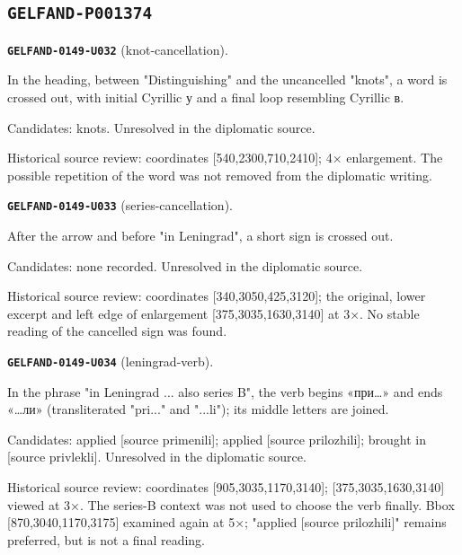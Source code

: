 \documentclass[11pt]{article}
\theoremstyle{definition}
\theoremstyle{remark}
\begin{document}
\subsection*{\texttt{GELFAND-P001374}}
\noindent\leavevmode{}\label{GELFAND-P001374:knot-cancellation:note}\textbf{\texttt{GELFAND-0149-U032}} (knot-cancellation).\par\nopagebreak[4]
In the heading, between "Distinguishing" and the uncancelled "knots", a word is crossed out, with initial Cyrillic у and a final loop resembling Cyrillic в.\par
Candidates: knots. Unresolved in the diplomatic source.\par
Historical source review: coordinates [540,2300,710,2410]; 4× enlargement. The possible repetition of the word was not removed from the diplomatic writing.\par\medskip
\noindent\leavevmode{}\label{GELFAND-P001374:series-cancellation:note}\textbf{\texttt{GELFAND-0149-U033}} (series-cancellation).\par\nopagebreak[4]
After the arrow and before "in Leningrad", a short sign is crossed out.\par
Candidates: none recorded. Unresolved in the diplomatic source.\par
Historical source review: coordinates [340,3050,425,3120]; the original, lower excerpt and left edge of enlargement [375,3035,1630,3140] at 3×. No stable reading of the cancelled sign was found.\par\medskip
\noindent\leavevmode{}\label{GELFAND-P001374:leningrad-verb:note}\textbf{\texttt{GELFAND-0149-U034}} (leningrad-verb).\par\nopagebreak[4]
In the phrase "in Leningrad ... also series B", the verb begins «при…» and ends «…ли» (transliterated "pri..." and "...li"); its middle letters are joined.\par
Candidates: applied [source primenili]; applied [source prilozhili]; brought in [source privlekli]. Unresolved in the diplomatic source.\par
Historical source review: coordinates [905,3035,1170,3140]; [375,3035,1630,3140] viewed at 3×. The series-B context was not used to choose the verb finally. Bbox [870,3040,1170,3175] examined again at 5×; "applied [source prilozhili]" remains preferred, but is not a final reading.\par\medskip
\end{document}
